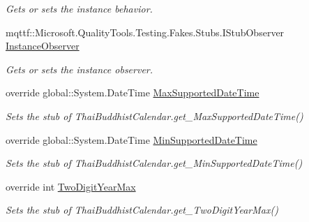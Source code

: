 \begin{DoxyCompactItemize}
\begin{DoxyCompactList}\small\item\em Gets or sets the instance behavior.\end{DoxyCompactList}\item 
mqttf\-::\-Microsoft.\-Quality\-Tools.\-Testing.\-Fakes.\-Stubs.\-I\-Stub\-Observer \hyperlink{class_system_1_1_globalization_1_1_fakes_1_1_stub_thai_buddhist_calendar_aa1400441612f991888a5f458ad6a6d11}{Instance\-Observer}
\begin{DoxyCompactList}\small\item\em Gets or sets the instance observer.\end{DoxyCompactList}\item 
override global\-::\-System.\-Date\-Time \hyperlink{class_system_1_1_globalization_1_1_fakes_1_1_stub_thai_buddhist_calendar_a0c1674df36accdd8640a07bae6a8fbed}{Max\-Supported\-Date\-Time}
\begin{DoxyCompactList}\small\item\em Sets the stub of Thai\-Buddhist\-Calendar.\-get\-\_\-\-Max\-Supported\-Date\-Time()\end{DoxyCompactList}\item 
override global\-::\-System.\-Date\-Time \hyperlink{class_system_1_1_globalization_1_1_fakes_1_1_stub_thai_buddhist_calendar_a174e9474a32ffbfab52a2cfe81e8be67}{Min\-Supported\-Date\-Time}
\begin{DoxyCompactList}\small\item\em Sets the stub of Thai\-Buddhist\-Calendar.\-get\-\_\-\-Min\-Supported\-Date\-Time()\end{DoxyCompactList}\item 
override int \hyperlink{class_system_1_1_globalization_1_1_fakes_1_1_stub_thai_buddhist_calendar_a83e9c4e3d6c3803b1e41769383563b8b}{Two\-Digit\-Year\-Max}
\begin{DoxyCompactList}\small\item\em Sets the stub of Thai\-Buddhist\-Calendar.\-get\-\_\-\-Two\-Digit\-Year\-Max()\end{DoxyCompactList}\end{DoxyCompactItemize}



